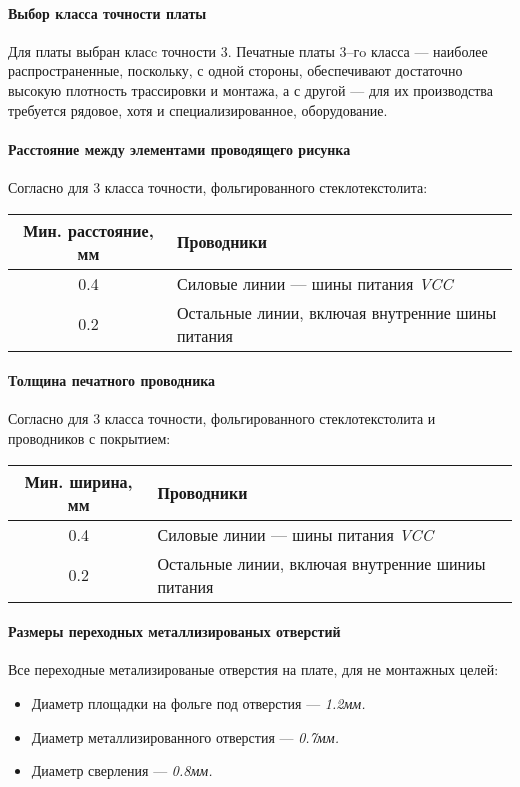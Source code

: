 \paragraph{Выбор класса точности платы}
Для платы выбран класc точности 3.
Печатные платы 3--гo класса --- наиболее распространенные, поскольку, с одной
стороны, обеспечивают достаточно высокую плотность трассировки и монтажа, а с
другой --- для их производства требуется рядовое, хотя и специализированное,
оборудование.

\paragraph{Расстояние между элементами проводящего рисунка}
Согласно \cite[Табл. 7]{GOST_23751_86} для 3 класса точности,
фольгированного стеклотекстолита:

\begin{tabular}{|c|l|}
    \hline
    Мин. расстояние, мм & Проводники \\
    \hline
    0.4 & Силовые линии --- шины питания \textit{VCC} \\
    \hline
    0.2 & Остальные линии, включая внутренние шины питания \\
    \hline
\end{tabular}

\paragraph{Толщина печатного проводника}
Согласно \cite[Табл. 9]{GOST_23751_86} для 3 класса точности,
фольгированного стеклотекстолита и проводников с покрытием:

\begin{tabular}{|c|l|}
    \hline
    Мин. ширина, мм & Проводники \\
    \hline
    0.4 & Силовые линии --- шины питания \textit{VCC} \\
    \hline
    0.2 & Остальные линии, включая внутренние шиниы питания \\
    \hline
\end{tabular}

\paragraph{Размеры переходных металлизированых отверстий}
Все переходные метализированые отверстия на плате, для не монтажных целей:

\begin{itemize}
    \item Диаметр площадки на фольге под отверстия --- \textit{1.2мм.}
    \item Диаметр металлизированного отверстия --- \textit{0.7мм.}
    \item Диаметр сверления --- \textit{0.8мм.}
\end{itemize}
